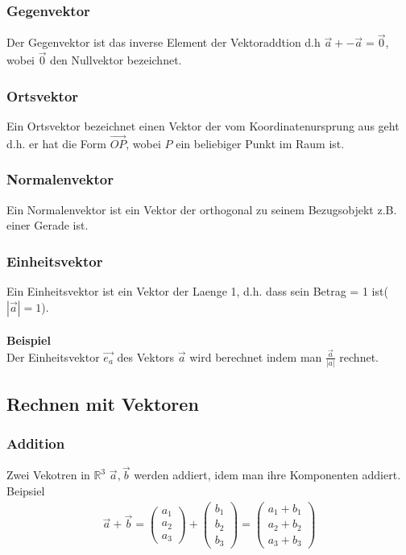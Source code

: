 \documentclass[a4paper]{article} %
\begin{document}
	\subsubsection{Gegenvektor}
	Der Gegenvektor ist das inverse Element der Vektoraddtion d.h $ \vec{a}+ -\vec{a}=\vec{0}$, wobei $\vec{0}$ den Nullvektor bezeichnet.
	\subsubsection{Ortsvektor}
	Ein Ortsvektor bezeichnet einen Vektor der vom Koordinatenursprung aus geht d.h. er hat die Form $\vec{OP}$, wobei $P$ ein beliebiger Punkt im Raum ist.
	\subsubsection{Normalenvektor}
	Ein Normalenvektor ist ein Vektor der orthogonal zu seinem Bezugsobjekt z.B. einer Gerade ist. 
	\subsubsection{Einheitsvektor}
	Ein Einheitsvektor ist ein Vektor der Laenge 1, d.h. dass sein Betrag = 1 ist($|\vec{a}|=1$).
	\\\\\textbf{Beispiel}\\
	Der Einheitsvektor $\vec{e_a}$ des Vektors $\vec{a}$ wird berechnet indem man $\frac{\vec{a}}{|a|}$ rechnet.
	\subsection{Rechnen mit Vektoren}
	\subsubsection{Addition}
	Zwei Vekotren in $\mathbb{R}^3$ $\vec{a}, \vec{b}$ werden addiert, idem man ihre Komponenten addiert.
	\\Beipsiel\\
	\begin{align*} \vec{a}+\vec{b}=\begin{pmatrix}a_1\\a_2\\a_3\end{pmatrix}+\begin{pmatrix}b_1\\b_2\\b_3\end{pmatrix}=\begin{pmatrix}a_1+b_1\\a_2+b_2\\a_3+b_3\end{pmatrix} \end{align*}
\end{document}
